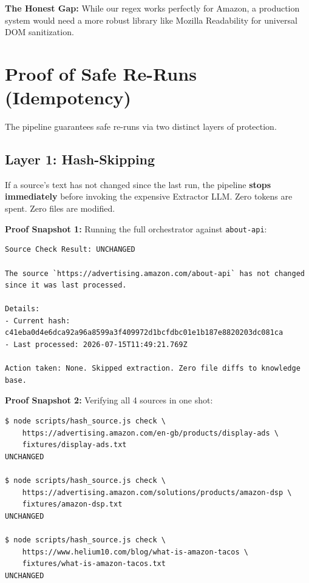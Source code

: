 \documentclass[11pt,a4paper]{article}
\begin{document}
\textbf{The Honest Gap:} While our regex works perfectly for Amazon, a production system would need a more robust library like Mozilla Readability for universal DOM sanitization.

\newpage
\section{Proof of Safe Re-Runs (Idempotency)}

The pipeline guarantees safe re-runs via two distinct layers of protection.

\subsection{Layer 1: Hash-Skipping}

\begin{infobox}
If a source's text has not changed since the last run, the pipeline \textbf{stops immediately} before invoking the expensive Extractor LLM. Zero tokens are spent. Zero files are modified.
\end{infobox}

\textbf{Proof Snapshot 1:} Running the full orchestrator against \texttt{about-api}:
\begin{lstlisting}
Source Check Result: UNCHANGED

The source `https://advertising.amazon.com/about-api` has not changed 
since it was last processed.

Details:
- Current hash: c41eba0d4e6dca92a96a8599a3f409972d1bcfdbc01e1b187e8820203dc081ca
- Last processed: 2026-07-15T11:49:21.769Z

Action taken: None. Skipped extraction. Zero file diffs to knowledge base.
\end{lstlisting}

\textbf{Proof Snapshot 2:} Verifying all 4 sources in one shot:
\begin{lstlisting}
$ node scripts/hash_source.js check \
    https://advertising.amazon.com/en-gb/products/display-ads \
    fixtures/display-ads.txt
UNCHANGED

$ node scripts/hash_source.js check \
    https://advertising.amazon.com/solutions/products/amazon-dsp \
    fixtures/amazon-dsp.txt
UNCHANGED

$ node scripts/hash_source.js check \
    https://www.helium10.com/blog/what-is-amazon-tacos \
    fixtures/what-is-amazon-tacos.txt
UNCHANGED
\end{lstlisting}
\end{document}
